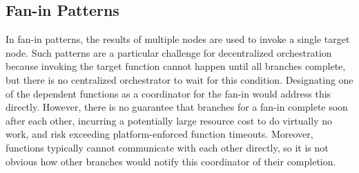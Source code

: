

\subsection{Fan-in Patterns}\label{sec:design:fanin}

In fan-in patterns, the results of multiple nodes are used to invoke a single
target node. Such patterns are a particular challenge for decentralized
orchestration because invoking the target function cannot happen until all
branches complete, but there is no centralized orchestrator to wait for this
condition. Designating one of the dependent functions as a coordinator for the
fan-in would address this directly. However, there is no guarantee that
branches for a fan-in complete soon after each other, incurring a potentially
large resource cost to do virtually no work, and risk exceeding
platform-enforced function timeouts. Moreover, functions typically cannot
communicate with each other directly, so it is not obvious how other branches
would notify this coordinator of their completion.

